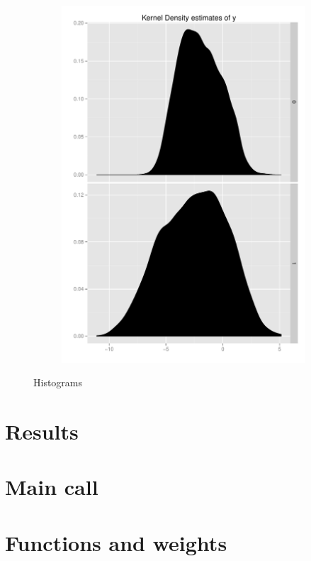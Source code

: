 \documentclass[11pt,letterpaper]{article}
\begin{document}
\begin{figure}[h]
    \begin{subfigure}[b]{0.3\textwidth}\centering \includegraphics[width=1\textwidth]{y} \end{subfigure}    
    \caption{Histograms}		
\end{figure}	



\clearpage
\section{Results}
%

\section{Main call}


\section{Functions and weights}


\end{document}
